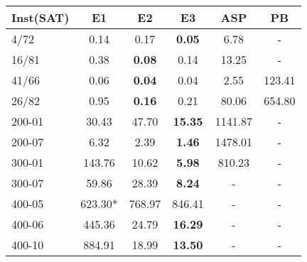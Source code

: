 
\begin{tabular}{ l|ccccc }
Inst(SAT)\;\;\;\; &E1 &E2 &E3 &ASP    &PB\\
    \hline
4/72   &0.14   &0.17   &{\bf 0.05}   &6.78   &-\\
16/81  &0.38   &{\bf 0.08 }  &0.14   &13.25  &-\\
41/66  &0.06   &{\bf 0.04 }  &0.04   &2.55   &123.41\\
26/82  &0.95   &{\bf 0.16 }  &0.21   &80.06  &654.80\\
200-01 &30.43  &47.70  &{\bf 15.35}  &1141.87    &-\\
200-07 &6.32   &2.39   &{\bf 1.46}   &1478.01    &-\\
300-01 &143.76 &10.62  &{\bf 5.98}   &810.23 &-\\
300-07 &59.86  &28.39  &{\bf 8.24}   &-  &-\\
400-05 &623.30*    &768.97 &846.41 &-  &-\\
400-06 &445.36 &24.79  &{\bf 16.29}  &-  &-\\
400-10 &884.91 &18.99  &{\bf 13.50}  &-  &-\\
    \hline
\end{tabular}

